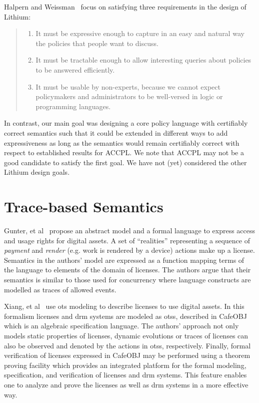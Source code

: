 Halpern and Weissman~\cite{Halpern2008} focus on satisfying three requirements in the design of Lithium:
\begin{quote}
\begin{enumerate}
  \item It must be expressive enough to capture in an easy and natural way the policies that people want to discuss.
  \item It must be tractable enough to allow interesting queries about policies to be answered efficiently.
  \item It must be usable by non-experts, because we cannot expect policymakers and administrators to be well-versed in logic or programming languages.
\end{enumerate}
\end{quote}

In contrast, our main goal was designing a core policy language with certifiably correct semantics such that it could be extended in different ways to add expressiveness as long as the semantics would remain certifiably correct with respect to established results for \ac{ACCPL}. We note that \ac{ACCPL} may not be a good candidate to satisfy the first goal. We have not (yet) considered the other Lithium design goals.


\section{Trace-based Semantics}
Gunter, et al~\cite{GunterWW01} propose an abstract model and a formal language to express access and usage rights for digital assets. A set of ``realities'' representing a sequence of \emph{payment} and \emph{render} (e.g. work is rendered by a device) actions make up a license. Semantics in the authors' model are expressed as a function mapping terms of the language to elements of the domain of licenses. The authors argue that their semantics is similar to those used for concurrency where language constructs are modelled as traces of allowed events.

Xiang, et al~\cite{xiang2008formal} use \ac{ots} modeling to describe licenses to use digital assets. In this formalism licenses and \ac{drm} systems are modeled as \ac{ots}s, described in CafeOBJ~\cite{cafeobj} which is an algebraic specification language. The authors' approach not only models static properties of licenses, dynamic evolutions or traces of licenses can also be observed and denoted by the actions in \ac{ots}s, respectively. Finally, formal verification of licenses expressed in CafeOBJ may be performed using a theorem proving facility which provides an integrated platform for the formal modeling, specification, and verification of licenses and \ac{drm} systems. This feature enables one to analyze and prove the licenses as well as \ac{drm} systems in a more effective way.

